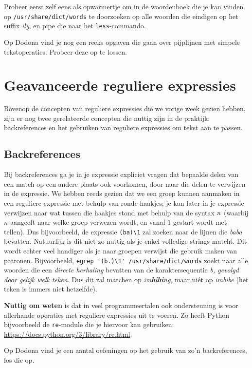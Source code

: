 \documentclass[a4paper,twoside,openany]{memoir}
\begin{document}
Probeer eerst zelf eens als opwarmertje om in de woordenboek die je kan vinden op \verb!/usr/share/dict/words! te doorzoeken op alle woorden die eindigen op het suffix \emph{ily}, en pipe die naar het \verb!less!-commando.

Op Dodona vind je nog een reeks opgaven die gaan over pijplijnen met simpele tekstoperaties. Probeer deze op te lossen.

\chapter{Geavanceerde reguliere expressies}

Bovenop de concepten van reguliere expressies die we vorige week gezien hebben, zijn er nog twee gerelateerde concepten die nuttig zijn in de praktijk: backreferences en het gebruiken van reguliere expressies om tekst aan te passen.

\section{Backreferences}
Bij backreferences ga je in je expressie expliciet vragen dat bepaalde delen van een match op een andere plaats ook voorkomen, door naar die delen te verwijzen in de expressie. We hebben reeds gezien dat we een groep kunnen aanmaken in een reguliere expressie met behulp van ronde haakjes; je kan later in je expressie verwijzen naar wat tussen die haakjes stond met behulp van de syntax  $\\n$ (waarbij $n$ aangeeft naar welke groep verwezen wordt, en vanaf 1 gestart wordt met tellen). Dus bijvoorbeeld, de expressie \verb!(ba)\1! zal zoeken naar de lijnen die \emph{baba} bevatten. Natuurlijk is dit niet zo nuttig als je enkel volledige strings matcht. Dit wordt echter veel handiger als je naar groepen verwijst die gebruik maken van patronen. Bijvoorbeeld, \verb!egrep '(b.)\1' /usr/share/dict/words! zoekt naar alle woorden die een \emph{directe herhaling} bevatten van de karaktersequentie \emph{b, gevolgd door gelijk welk teken}. Dus dit zal matchen op \emph{im\textbf{bibi}ng}, maar ni\'et op \emph{imbibe} (het teken is immers niet hetzelfde).

\textbf{Nuttig om weten} is dat in veel programmeertalen ook ondersteuning is voor allerhande operaties met reguliere expressies uit te voeren. Zo heeft Python bijvoorbeeld de \verb!re!-module die je hiervoor kan gebruiken: \url{https://docs.python.org/3/library/re.html}.


Op Dodona vind je een aantal oefeningen op het gebruik van zo'n backreferences, los die op.
\end{document}
